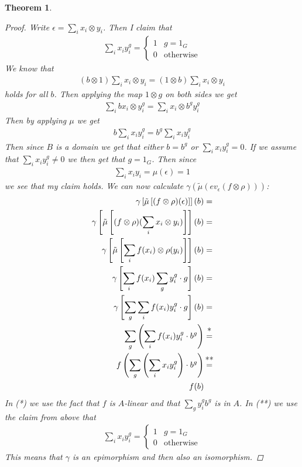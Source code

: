 \documentclass[11pt, a4paper, english]{article}
\numberwithin{prop}{section}
\numberwithin{lemma}{section}
\newtheorem{theorem}{Theorem}
\numberwithin{theorem}{section}
\numberwithin{defin}{section}
\numberwithin{example}{section}
\begin{document}
\begin{theorem}
\begin{proof}
Write $\epsilon = \sum\limits_i x_i \otimes y_i$. Then I claim that 
\begin{align*}
\sum_i x_i y_i^g = \begin{cases}
1 & g = 1_G\\
0 & \text{otherwise}
\end{cases}
\end{align*}
We know that 
\begin{align*}
(b \otimes 1)\sum_i x_i \otimes y_i = (1 \otimes b)\sum_i x_i \otimes y_i
\end{align*}
holds for all $b$. Then applying the map $1 \otimes g$ on both sides we get
\begin{align*}
\sum_i bx_i \otimes y_i^g = \sum_i x_i \otimes b^gy_i^g
\end{align*}
Then by applying $\mu$ we get 
\begin{align*}
b\sum_i x_i y_i^g = b^g\sum_i x_i  y_i^g
\end{align*}
Then since $B$ is a domain we get that either $b = b^g$ or $\sum_i x_i  y_i^g = 0$. If we assume that $\sum_i x_i  y_i^g \neq 0$ we then get that $g = 1_G$. Then since
\begin{align*}
\sum_i x_i  y_i = \mu(\epsilon) = 1
\end{align*}
we see that my claim holds. We can now calculate $\gamma(\tilde{\mu}(ev_\epsilon(f \otimes \rho)))$:
\begin{align*}
\gamma \left[ \tilde{\mu} \left[ (f \otimes \rho)(\epsilon) \right] \right] (b) &=\\ 
\gamma \left[ \tilde{\mu} \left[ (f \otimes \rho)(\sum_i x_i \otimes y_i) \right] \right] (b) &=\\
\gamma \left[ \tilde{\mu} \left[ \sum_i f(x_i) \otimes \rho(y_i) \right] \right] (b) &=\\
\gamma \left[ \sum_i f(x_i) \sum_g y_i^g \cdot g \right] (b) &=\\
\gamma \left[ \sum_g \sum_i f(x_i) y_i^g \cdot g \right] (b) &=\\
\sum_g \left(\sum_i f(x_i) y_i^g \cdot b^g \right) &\stackrel{\mathclap{\normalfont\mbox{*}}}{=}\\
f \left( \sum_g \left(\sum_i x_i y_i^g \right) \cdot b^g \right) &\stackrel{\mathclap{\normalfont\mbox{**}}}{=}\\
f(b) &
\end{align*}
In (*) we use the fact that $f$ is $A$-linear and that $\sum_g y_i^g b^g$ is in $A$. In (**) we use the claim from above that 
\begin{align*}
\sum_i x_i y_i^g = \begin{cases}
1 & g = 1_G\\
0 & \text{otherwise}
\end{cases}
\end{align*}
This means that $\gamma$ is an epimorphism and then also an isomorphism.
\end{proof}
\end{theorem}
\end{document}
